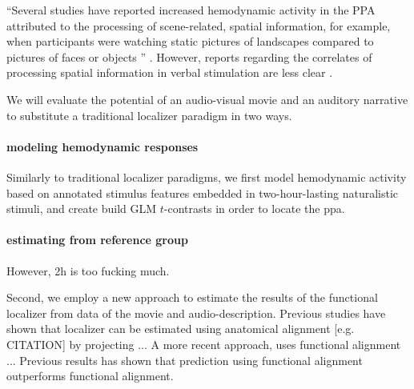 ``Several studies have reported increased hemodynamic activity in the PPA
attributed to the processing of scene-related, spatial information, for example,
when participants were watching static pictures of landscapes compared to
pictures of faces or objects \citep{epstein1998ppa,
epstein1999parahippocampal}'' \citep{haeusler2022processing}.
However, reports regarding the correlates of processing spatial information in
verbal stimulation are less clear \citep{aziz2008modulation}.

%
We will evaluate the potential of an audio-visual movie and an auditory
narrative to substitute a traditional localizer paradigm in two ways.


\paragraph{modeling hemodynamic responses}
%
Similarly to traditional localizer paradigms, we first model hemodynamic
activity based on annotated stimulus features embedded in two-hour-lasting
naturalistic stimuli, and create build GLM $t$-contrasts in order to locate the
\ac{ppa}.


\paragraph{estimating from reference group}




%
However, 2h is too fucking much.

%
Second, we employ a new approach to estimate the results of the functional
localizer from data of the movie and audio-description.
%
Previous studies have shown that localizer can be estimated using anatomical
alignment [e.g. CITATION] by projecting ...
%
A more recent approach, uses functional alignment \citep{haxby2020hyperalignment,
bazeille2021empirical} ...
%
Previous results has shown that prediction using functional alignment
outperforms functional alignment.



